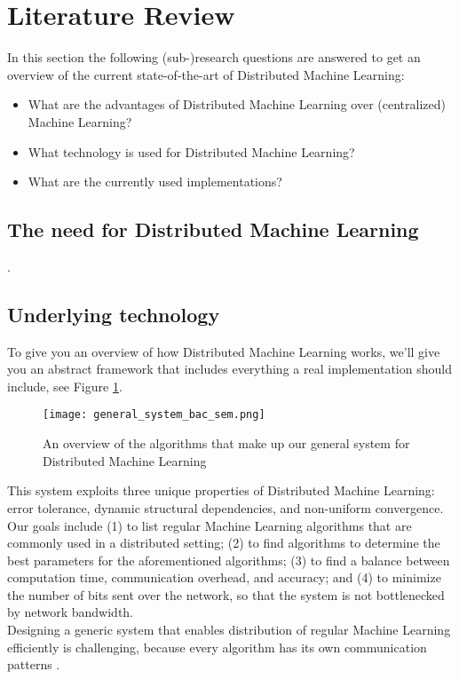 \section{Literature Review}
In this section the following (sub-)research questions are answered to get an overview of the current state-of-the-art of Distributed Machine Learning:
\begin{itemize}
	\item What are the advantages of Distributed Machine Learning over (centralized) Machine Learning?
	\item What technology is used for Distributed Machine Learning?
	\item What are the currently used implementations?
\end{itemize}

\subsection{The need for Distributed Machine Learning}
.









\subsection{Underlying technology}
To give you an overview of how Distributed Machine Learning works, we'll give you an abstract framework that includes everything a real implementation should include, see Figure \ref{overview_system}.\\
\begin{figure}[H]
	\texttt{[image: general\_system\_bac\_sem.png]}
	\caption{An overview of the algorithms that make up our general system for Distributed Machine Learning}
	\label{overview_system}
\end{figure}
This system exploits three unique properties of Distributed Machine Learning: error tolerance, dynamic structural dependencies, and non-uniform convergence.\cite{Xing16}\\
Our goals include (1) to list regular Machine Learning algorithms that are commonly used in a distributed setting; (2) to find algorithms to determine the best parameters for the aforementioned algorithms; (3) to find a balance between computation time, communication overhead, and accuracy; and (4) to minimize the number of bits sent over the network, so that the system is not bottlenecked by network bandwidth.\\
Designing a generic system that enables distribution of  regular Machine Learning efficiently is challenging, because every algorithm has its own communication patterns \cite{Jia14}\cite{Newman09}\cite{Rich13}\cite{Smola10}\cite{Takac13}\cite{Tsi12}.

